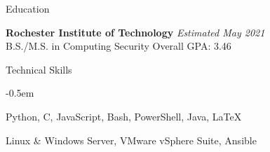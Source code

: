 \documentclass[8pt]{resume} %
\begin{document}

\begin{rSection}{Education}

{\bf Rochester Institute of Technology} \hfill {\em Estimated May 2021} \\ 
B.S./M.S. in Computing Security \hfill Overall GPA: 3.46

\end{rSection}


\begin{rSection}{Technical Skills}

    \begin{multicols}{2}[]

    \begin{description}
        \itemsep -0.5em
        \item[Languages] Python, C, JavaScript, Bash, PowerShell, Java, \LaTeX
        \item[Tools/Software] Linux \& Windows Server, VMware vSphere Suite,
            Ansible
    \end{description}

    \end{multicols}

\end{rSection}

\end{document}
